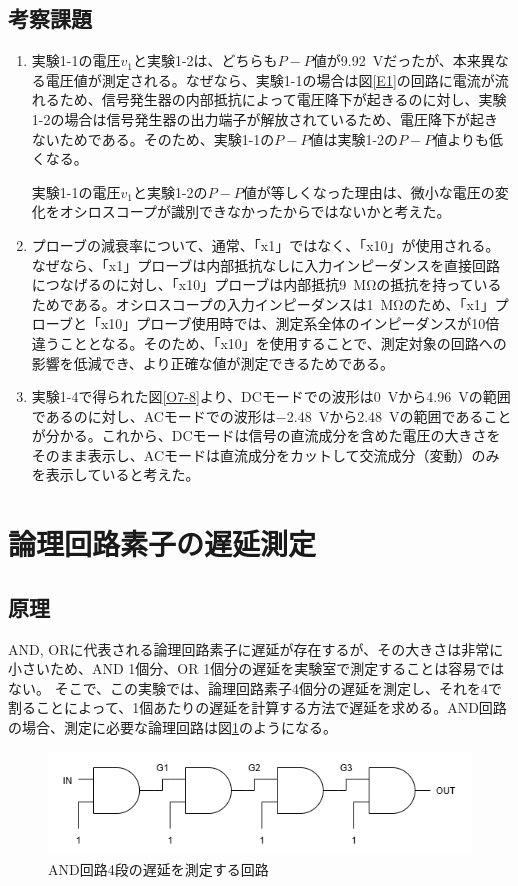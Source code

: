 \documentclass[uplatex, a4j, dvipdfmx]{jsarticle}
\begin{document}
\subsection{考察課題}
\begin{enumerate}[label=(\arabic*), itemsep=1.5ex, leftmargin=2.5em]
    \item 実験1-1の電圧$v_1$と実験1-2は、どちらも$P-P$値が\SI{9.92}{\volt}だったが、本来異なる電圧値が測定される。なぜなら、実験1-1の場合は図\ref{E1}の回路に電流が流れるため、信号発生器の内部抵抗によって電圧降下が起きるのに対し、実験1-2の場合は信号発生器の出力端子が解放されているため、電圧降下が起きないためである。そのため、実験1-1の$P-P$値は実験1-2の$P-P$値よりも低くなる。

    実験1-1の電圧$v_1$と実験1-2の$P-P$値が等しくなった理由は、微小な電圧の変化をオシロスコープが識別できなかったからではないかと考えた。
    
    \item プローブの減衰率について、通常、「x1」ではなく、「x10」が使用される。なぜなら、「x1」プローブは内部抵抗なしに入力インピーダンスを直接回路につなげるのに対し、「x10」プローブは内部抵抗\SI{9}{\mega\ohm}の抵抗を持っているためである。オシロスコープの入力インピーダンスは\SI{1}{\mega\ohm}のため、「x1」プローブと「x10」プローブ使用時では、測定系全体のインピーダンスが10倍違うこととなる。そのため、「x10」を使用することで、測定対象の回路への影響を低減でき、より正確な値が測定できるためである。
    
    \item 実験1-4で得られた図\ref{O7-8}より、DCモードでの波形は\SI{0}{\volt}から\SI{4.96}{\volt}の範囲であるのに対し、ACモードでの波形は\SI{-2.48}{\volt}から\SI{2.48}{\volt}の範囲であることが分かる。これから、DCモードは信号の直流成分を含めた電圧の大きさをそのまま表示し、ACモードは直流成分をカットして交流成分（変動）のみを表示していると考えた。
\end{enumerate}

\section{論理回路素子の遅延測定}
\subsection{原理}
AND, ORに代表される論理回路素子に遅延が存在するが、その大きさは非常に小さいため、AND 1個分、OR 1個分の遅延を実験室で測定することは容易ではない。
そこで、この実験では、論理回路素子4個分の遅延を測定し、それを4で割ることによって、1個あたりの遅延を計算する方法で遅延を求める。AND回路の場合、測定に必要な論理回路は図\ref{E2}のようになる。
\begin{figure}[htbp]
    \centering
    \includegraphics[width=0.7\linewidth]{picture/E2.png}
    \caption{AND回路4段の遅延を測定する回路}
    \label{E2}
\end{figure}
\end{document}
